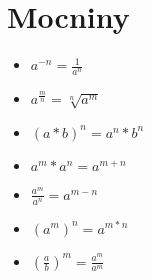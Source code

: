 \documentclass[main.tex]{subfiles}
\begin{document}
\section*{Mocniny}
\begin{multicols}{2}
  \begin{itemize}
    \item $a^{-n}=\frac{1}{a^n}$
    \item $a^{\frac{m}{n}}=\sqrt[n]{a^m}$
    \item $(a*b)^n =a^n *b^n$
    \item $a^m * a^n = a^{m+n}$
  \columnbreak
    \item $\frac{a^m}{a^n}=a^{m-n}$
    \item $(a^m)^n = a^{m*n}$
    \item $\left(\frac{a}{b}\right)^m = \frac{a^m}{a^m}$
  \end{itemize}
\end{multicols}
\end{document}
